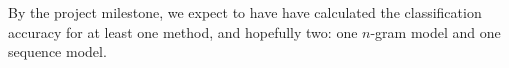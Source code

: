 \documentclass[11pt,letterpaper]{article}
\numberwithin{equation}{section}
\numberwithin{figure}{section}
\begin{document}
By the project milestone, we expect to have have calculated the classification accuracy for at least one method, and hopefully two: one $n$-gram model and one sequence model.



\nocite{*}




\end{document}
